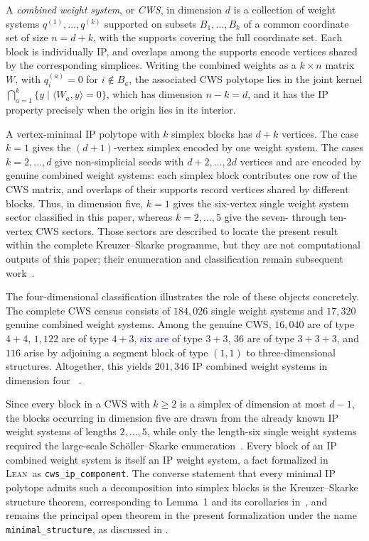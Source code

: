 \documentclass[appliedmath,article,submit,moreauthors]{Definitions/mdpi}
\newcommand{\Lean}{\textsc{Lean}}
\begin{document}
\begin{Definition}
\label{def:cws}
A \emph{combined weight system}, or \emph{CWS}, in dimension \(d\) is a
collection of weight systems \(q^{(1)},\ldots,q^{(k)}\) supported on subsets
\(B_1,\ldots,B_k\) of a common coordinate set of size \(n=d+k\), with the
supports covering the full coordinate set. Each block is individually IP, and
overlaps among the supports encode vertices shared by the corresponding
simplices. Writing the combined weights as a \(k\times n\) matrix \(W\), with
\(q_i^{(a)}=0\) for \(i\notin B_a\), the associated CWS polytope lies in the
joint kernel \(\bigcap_{a=1}^k\{y\mid \langle W_a,y\rangle=0\}\), which has
dimension \(n-k=d\), and it has the IP property precisely when the origin lies
in its interior.
\end{Definition}

{\color{blue}
A vertex-minimal IP polytope with \(k\) simplex blocks has \(d+k\) vertices.
The case \(k=1\) gives the \((d+1)\)-vertex simplex encoded by one weight
system. The cases \(k=2,\ldots,d\) give non-simplicial seeds with
\(d+2,\ldots,2d\) vertices and are encoded by genuine combined weight systems:
each simplex block contributes one row of the CWS matrix, and overlaps of their
supports record vertices shared by different blocks. Thus, in dimension five,
\(k=1\) gives the six-vertex single weight system sector classified in this
paper, whereas \(k=2,\ldots,5\) give the seven- through ten-vertex CWS sectors.
Those sectors are described to locate the present result within the complete
Kreuzer--Skarke programme, but they are not computational outputs of this
paper; their enumeration and classification remain subsequent
work~\cite{KS97,Scholler2019}.
}

The four-dimensional classification illustrates the role of these objects
concretely. The complete CWS census consists of \(184{,}026\) single weight
systems and \(17{,}320\) genuine combined weight systems. Among the genuine CWS,
\(16{,}040\) are of type \(4+4\), \(1{,}122\) are of type \(4+3\), \textcolor{blue}{six are} of
type \(3+3\), \(36\) are of type \(3+3+3\), and \(116\) arise by adjoining a
segment block of type \((1,1)\) to three-dimensional structures. Altogether,
this yields \(201{,}346\) IP combined weight systems in dimension four
~\cite{KreuzerSkarke2000,KSFibrations2002,KreuzerCYData}.

Since every block in a CWS with \(k\geq2\) is a simplex of dimension at most
\(d-1\), the blocks occurring in dimension five are drawn from the already known
IP weight systems of lengths \(2,\ldots,5\), while only the length-six single
weight systems required the large-scale Sch\"oller--Skarke
enumeration~\cite{Scholler2019}. Every block of an IP combined weight system is
itself an IP weight system, a fact formalized in \Lean\ as
\nolinkurl{cws\_ip\_component}. The converse statement that every minimal IP
polytope admits such a decomposition into simplex blocks is the Kreuzer--Skarke
structure theorem, corresponding to Lemma~1 and its corollaries in~\cite{KS97},
and remains the principal open theorem in the present formalization under the
name \nolinkurl{minimal\_structure}, as discussed in
.
\end{document}
